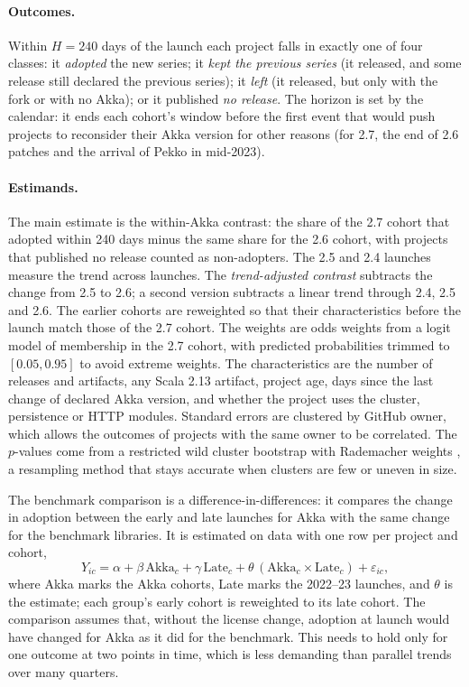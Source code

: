 \documentclass[11pt]{article}
\begin{document}
\paragraph{Outcomes.} Within $H=240$ days of the launch each project falls in exactly one of four classes: it \emph{adopted} the new series; it \emph{kept the previous series} (it released, and some release still declared the previous series); it \emph{left} (it released, but only with the fork or with no Akka); or it published \emph{no release}. The horizon is set by the calendar: it ends each cohort's window before the first event that would push projects to reconsider their Akka version for other reasons (for 2.7, the end of 2.6 patches and the arrival of Pekko in mid-2023).

\paragraph{Estimands.} The main estimate is the within-Akka contrast: the share of the 2.7 cohort that adopted within 240 days minus the same share for the 2.6 cohort, with projects that published no release counted as non-adopters. The 2.5 and 2.4 launches measure the trend across launches. The \emph{trend-adjusted contrast} subtracts the change from 2.5 to 2.6; a second version subtracts a linear trend through 2.4, 2.5 and 2.6. The earlier cohorts are reweighted so that their characteristics before the launch match those of the 2.7 cohort. The weights are odds weights from a logit model of membership in the 2.7 cohort, with predicted probabilities trimmed to $[0.05,0.95]$ to avoid extreme weights. The characteristics are the number of releases and artifacts, any Scala 2.13 artifact, project age, days since the last change of declared Akka version, and whether the project uses the cluster, persistence or HTTP modules. Standard errors are clustered by GitHub owner, which allows the outcomes of projects with the same owner to be correlated. The $p$-values come from a restricted wild cluster bootstrap with Rademacher weights \citep{cameron2008}, a resampling method that stays accurate when clusters are few or uneven in size.

The benchmark comparison is a difference-in-differences: it compares the change in adoption between the early and late launches for Akka with the same change for the benchmark libraries. It is estimated on data with one row per project and cohort,
\[
Y_{ic} = \alpha + \beta\,\text{Akka}_c + \gamma\,\text{Late}_c + \theta\,(\text{Akka}_c\times \text{Late}_c) + \varepsilon_{ic},
\]
where Akka marks the Akka cohorts, Late marks the 2022--23 launches, and $\theta$ is the estimate; each group's early cohort is reweighted to its late cohort. The comparison assumes that, without the license change, adoption at launch would have changed for Akka as it did for the benchmark. This needs to hold only for one outcome at two points in time, which is less demanding than parallel trends over many quarters.
\end{document}
